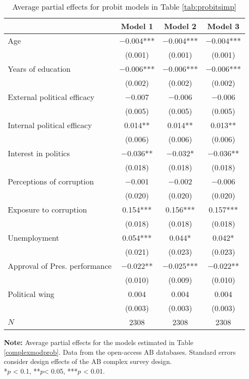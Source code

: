 \documentclass[12pt,a4]{article}
\begin{document}
\begin{table}[htbp]
\caption{Average partial effects for probit models in Table \ref{tab:probitsimp}}
\begin{center}
\label{tab:probitcompape}

\begin{tabular}[t]{lccc}
\toprule
  & Model 1 & Model 2 & Model 3\\
\midrule
Age & \num{-0.004}*** & \num{-0.004}*** & \num{-0.004}***\\
 & (\num{0.001}) & (\num{0.001}) & (\num{0.001})\\
Years of education & \num{-0.006}*** & \num{-0.006}*** & \num{-0.006}***\\
 & (\num{0.002}) & (\num{0.002}) & (\num{0.002})\\
External political efficacy & \num{-0.007} & \num{-0.006} & \num{-0.006}\\
 & (\num{0.005}) & (\num{0.005}) & (\num{0.005})\\
Internal political efficacy & \num{0.014}** & \num{0.014}** & \num{0.013}**\\
 & (\num{0.006}) & (\num{0.006}) & (\num{0.006})\\
Interest in politics & \num{-0.036}** & \num{-0.032}* & \num{-0.036}**\\
 & (\num{0.018}) & (\num{0.018}) & \vphantom{1} (\num{0.018})\\
Perceptions of corruption & \num{-0.001} & \num{-0.002} & \num{-0.006}\\
 & (\num{0.020}) & (\num{0.020}) & (\num{0.020})\\
Exposure to corruption & \num{0.154}*** & \num{0.156}*** & \num{0.157}***\\
 & (\num{0.018}) & (\num{0.018}) & (\num{0.018})\\
Unemployment & \num{0.054}*** & \num{0.044}* & \num{0.042}*\\
 & (\num{0.021}) & (\num{0.023}) & (\num{0.023})\\
Approval of Pres. performance & \num{-0.022}** & \num{-0.025}*** & \num{-0.022}**\\
 & (\num{0.010}) & (\num{0.009}) & (\num{0.010})\\
Political wing & \num{0.004} & \num{0.004} & \num{0.004}\\
 & (\num{0.003}) & (\num{0.003}) & (\num{0.003})\\
\midrule
$N$ & \num{2308} & \num{2308} & \num{2308}\\
\bottomrule
\end{tabular}


\vspace{0.25cm}
\end{center}
\textbf{Note:} Average partial effects for the models estimated in Table \ref{complexmodprob}. Data from the open-access AB databases. Standard errors consider design effects of the AB complex survey design.\\
*$p$ < 0.1, **$p$< 0.05, ***$p$ < 0.01.
\end{table}
\end{document}
